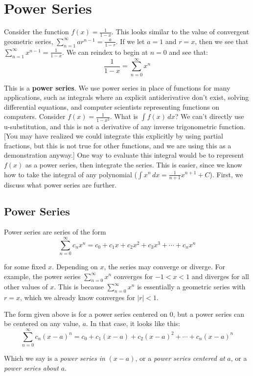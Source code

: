 \chapter{Power Series}

Consider the function $f(x) = \frac{1}{1-x}$. This looks similar to the value 
of convergent geometric series, $\sum_{n=1}^\infty ar^{n-1} = \frac{a}{1-r}$. 
If we let $a = 1$ and $r = x$, then we see that $\sum_{n=1}^\infty x^{n-1} = 
\frac{1}{1-x}$. We can reindex to begin at $n=0$ and see that:
$$\frac{1}{1-x} = \sum_{n=0}^\infty x^n$$

This is a \textbf{power series}. We use power series in place of functions for many 
applications, such as integrals where an explicit antiderivative don't exist, solving 
differential equations, and computer scientists representing functions on 
computers. Consider $f(x) = \frac{1}{1-x^2}$. What is $\int 
f(x)\,dx$? We can't directly use u-substitution, and this is not a derivative of 
any inverse trigonometric function. [You may have realized we could integrate 
this explicitly by using partial fractions, but this is not true for other 
functions, and we are using this as a demonstration anyway.] One way to 
evaluate this integral would be to represent $f(x)$ as a power series, then 
integrate the series. This is easier, since we know how to take the integral 
of any polynomial ($\int x^n\,dx = \frac{1}{n+1}x^{n+1} + C$). First, we 
discuss what power series are further.

\section{Power Series}
Power series are series of the form
$$\sum_{n=0}^\infty c_n x^n = c_0 + c_1 x + c_2 x^2 + c_3 x^3 + \cdots + c_n 
x^n$$

for some fixed $x$. Depending on $x$, the series may converge or diverge. For 
example, the power series $\sum_{n=0}^\infty x^n$ converges for $ -1 < x < 1$ 
and diverges for all other values of $x$. This is because $\sum_{n=0}^\infty 
x^n$ is essentially a geometric series with $r = x$, which we already know 
converges for $|r|<1$. 

The form given above is for a power series centered on $0$, but a power series 
can be centered on any value, $a$. In that case, it looks like this:
$$\sum_{n=0}^\infty c_n (x - a)^n = c_0 + c_1(x - a) + c_2(x - a)^2 + \cdots + 
c_n(x - a)^n$$

Which we say is a \textit{power series in }$(x - a)$, or a \textit{power 
series centered at }$a$, or a \textit{power series about }$a$. 

